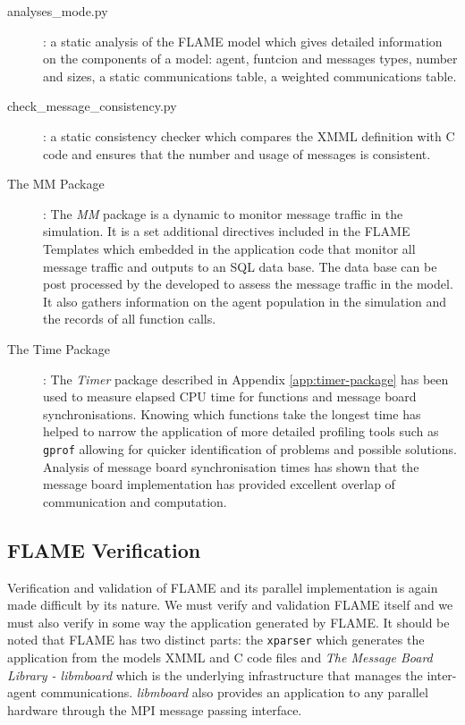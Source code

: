 \begin{description}

	\item [analyses\_mode.py]: a static analysis of the FLAME model which gives detailed information on the components of a model: agent, funtcion and messages types, number and sizes, a static communications table, a weighted communications table.

	\item [check\_message\_consistency.py]: a static consistency checker which compares the XMML definition with C code and ensures that the number and usage of messages is consistent.

	\item [The MM Package]: The \textit{MM} package is a dynamic to monitor message traffic in the simulation. It is a set additional directives included in the FLAME Templates which embedded in the application code that monitor all message traffic and outputs to an SQL data base. The data base can be post processed by the developed to assess the message traffic in the model. It also gathers information on the agent population in the simulation and the records of all function calls.

	\item [The Time Package]: The \textit{Timer} package described in Appendix \ref{app:timer-package} has been used to measure elapsed CPU time for functions and message board synchronisations. Knowing which functions take the longest time has helped to narrow the application of more detailed profiling tools such as \texttt{gprof} allowing for quicker identification of problems and possible solutions. Analysis of message board synchronisation times has shown that the message board implementation has provided excellent overlap of communication and computation.

\end{description}


\subsection {FLAME Verification}

Verification and validation of FLAME and its parallel implementation is again made difficult by its nature. We must verify and validation FLAME itself and we must also verify in some way the application generated by FLAME. It should be noted that FLAME has two distinct parts: the \texttt{xparser} which generates the application from the models XMML and C code files and \textit{The Message Board Library - libmboard} which is the underlying infrastructure that manages the inter-agent communications. \textit{libmboard} also provides an application to any parallel hardware through the MPI message passing interface.


